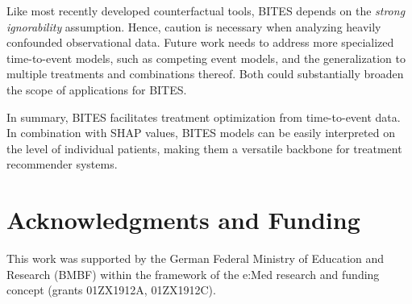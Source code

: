 \documentclass{article}
\begin{document}
	Like most recently developed counterfactual tools, BITES depends on the \textit{strong ignorability} assumption. Hence, caution is necessary when analyzing heavily confounded observational data. 
	Future work needs to address more specialized time-to-event models, such as competing event models, and the generalization to multiple treatments and combinations thereof. Both could substantially broaden the scope of applications for BITES.
	
	In summary, BITES facilitates treatment optimization from time-to-event data. In combination with SHAP values, BITES models can be easily interpreted on the level of individual patients, making them a versatile backbone for treatment recommender systems.
	
	
	\section*{Acknowledgments and Funding}
	This work was supported by the German Federal Ministry of Education and Research (BMBF) within the framework of the e:Med research and funding concept (grants 01ZX1912A, 01ZX1912C).
	
	
	
	
\end{document}
